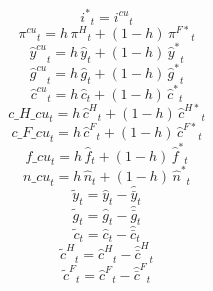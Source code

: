 \begin{dmath}
{{i^*}}_{t}={{i^{cu}}}_{t}
\end{dmath}
\begin{dmath}
{{\pi^{cu}}}_{t}={{h}}\, {{\pi^H}}_{t}+\left(1-{{h}}\right)\, {{\pi^{F*}}}_{t}
\end{dmath}
\begin{dmath}
{{\hat y^{cu}}}_{t}={{h}}\, {{\hat y}}_{t}+\left(1-{{h}}\right)\, {{\hat y^*}}_{t}
\end{dmath}
\begin{dmath}
{{\hat g^{cu}}}_{t}={{h}}\, {{\hat g}}_{t}+\left(1-{{h}}\right)\, {{\hat g^*}}_{t}
\end{dmath}
\begin{dmath}
{{\hat c^{cu}}}_{t}={{h}}\, {{\hat c}}_{t}+\left(1-{{h}}\right)\, {{\hat c^*}}_{t}
\end{dmath}
\begin{dmath}
{c\_H\_cu}_{t}={{h}}\, {{\hat c^H}}_{t}+\left(1-{{h}}\right)\, {{\hat c^{H*}}}_{t}
\end{dmath}
\begin{dmath}
{c\_F\_cu}_{t}={{h}}\, {{\hat c^F}}_{t}+\left(1-{{h}}\right)\, {{\hat c^{F*}}}_{t}
\end{dmath}
\begin{dmath}
{f\_cu}_{t}={{h}}\, {{\hat f}}_{t}+\left(1-{{h}}\right)\, {{\hat f^*}}_{t}
\end{dmath}
\begin{dmath}
{n\_cu}_{t}={{h}}\, {{\hat n}}_{t}+\left(1-{{h}}\right)\, {{\hat n^*}}_{t}
\end{dmath}
\begin{dmath}
{{\tilde y}}_{t}={{\hat y}}_{t}-{{\hat {\bar y}}}_{t}
\end{dmath}
\begin{dmath}
{{\tilde g}}_{t}={{\hat g}}_{t}-{{\hat {\bar g}}}_{t}
\end{dmath}
\begin{dmath}
{{\tilde c}}_{t}={{\hat c}}_{t}-{{\hat {\bar c}}}_{t}
\end{dmath}
\begin{dmath}
{{\tilde c^H}}_{t}={{\hat c^H}}_{t}-{{\hat {\bar c}^H}}_{t}
\end{dmath}
\begin{dmath}
{{\tilde c^F}}_{t}={{\hat c^F}}_{t}-{{\hat {\bar c}^F}}_{t}
\end{dmath}
